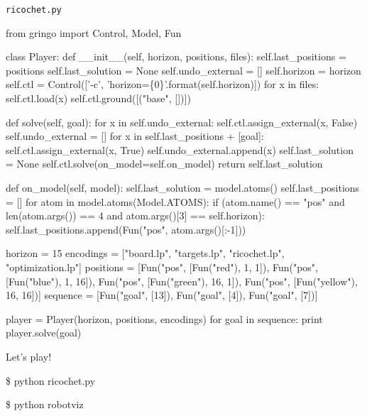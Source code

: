 \begin{frame}[fragile]{\texttt{ricochet.py}}
\Tiny\vspace{-15pt}
\begin{semiverbatim}
from gringo import Control, Model, Fun

class Player:
    def __init__(self, horizon, positions, files):
        self.last_positions = positions
        self.last_solution = None
        self.undo_external = []
        self.horizon = horizon
        self.ctl = Control(['-c', 'horizon=\{0\}'.format(self.horizon)])
        for x in files:
            self.ctl.load(x)
        self.ctl.ground([("base", [])])

    def solve(self, goal):
        for x in self.undo_external:
            self.ctl.assign_external(x, False)
        self.undo_external = []
        for x in self.last_positions + [goal]:
            self.ctl.assign_external(x, True)
            self.undo_external.append(x)
        self.last_solution = None
        self.ctl.solve(on_model=self.on_model)
        return self.last_solution

    def on_model(self, model):
        self.last_solution = model.atoms()
        self.last_positions = []
        for atom in model.atoms(Model.ATOMS):
            if (atom.name() == "pos" and len(atom.args()) == 4 and atom.args()[3] == self.horizon):
                self.last_positions.append(Fun("pos", atom.args()[:-1]))

horizon   = 15
encodings = ["board.lp", "targets.lp", "ricochet.lp", "optimization.lp"]
positions = [Fun("pos", [Fun("red"),     1,  1]), Fun("pos", [Fun("blue"),    1, 16]),
             Fun("pos", [Fun("green"),  16,  1]), Fun("pos", [Fun("yellow"), 16, 16])]
sequence  = [Fun("goal", [13]), Fun("goal", [4]), Fun("goal", [7])]

player = Player(horizon, positions, encodings)
for goal in sequence:
    print player.solve(goal)
\end{semiverbatim}
\end{frame}
\begin{frame}[fragile]{Let's play!}
\scriptsize
\begin{semiverbatim}
\$ python ricochet.py

\pause\$ python robotviz
\end{semiverbatim}
\end{frame}
%
